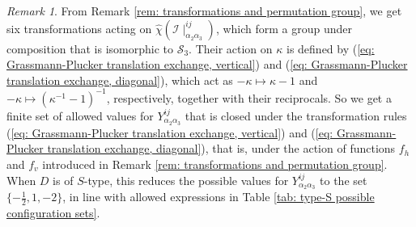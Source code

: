 \documentclass[10pt]{article}
\theoremstyle{remark}%
\newtheorem{rem}{Remark}%
\theoremstyle{definition}%
\begin{document}
\begin{rem}
\label{rem: permutation group representation and scalars}
From Remark \ref{rem: transformations and permutation group}, we get six transformations acting on $\hat{\chi}(\mathcal{I}\mid_{\alpha_{2}\alpha_{3}}^{ij})$, which form a group under composition that is isomorphic to $\mathcal{S}_{3}$. Their action on $\kappa$ is defined by (\ref{eq: Grassmann-Plucker translation exchange, vertical}) and (\ref{eq: Grassmann-Plucker translation exchange, diagonal}), which act as $-\kappa\mapsto\kappa-1$ and $-\kappa\mapsto (\kappa^{-1}-1)^{-1}$, respectively, together with their reciprocals. So we get a finite set of allowed values for $Y_{\alpha_{2}\alpha_{3}}^{ij}$ that is closed under the transformation rules (\ref{eq: Grassmann-Plucker translation exchange, vertical}) and (\ref{eq: Grassmann-Plucker translation exchange, diagonal}), that is, under the action of functions $f_{h}$ and $f_{v}$ introduced in Remark \ref{rem: transformations and permutation group}. When $D$ is of $S$-type, this reduces the possible values for $Y_{\alpha_{2}\alpha_{3}}^{ij}$ to the set $\{-\frac{1}{2},1,-2\}$, in line with allowed expressions in Table \ref{tab: type-S possible configuration sets}. 
\end{rem}
\end{document}
